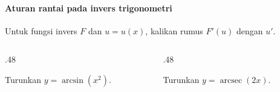 \documentclass{../../kalkulus-ppt}
\DeclareMathOperator{\arcsec}{arcsec}
\begin{document}
\begin{frame}{\insertsection}
    \framesubtitle{Aturan rantai pada invers trigonometri}
    Untuk fungsi invers $F$ dan $u=u(x)$, kalikan rumus $F'(u)$ dengan $u'$.
    \begin{columns}[t,onlytextwidth]
        \begin{column}{.48\textwidth}
            \begin{contoh}
                Turunkan $y=\arcsin(x^2)$.
            \end{contoh}
        \end{column}
        \begin{column}{.48\textwidth}
            \begin{contoh}
                Turunkan $y=\arcsec(2x)$.
            \end{contoh}
        \end{column}
    \end{columns}
\end{frame}
\end{document}

